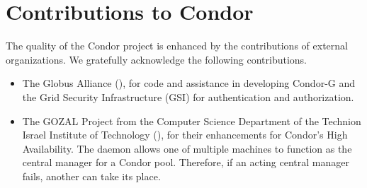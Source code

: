 \section{\label{sec:contributions}Contributions to Condor}

The quality of the Condor project is enhanced by the contributions
of external organizations.
We gratefully acknowledge the following contributions. 

\begin{itemize}
\item{The Globus Alliance} (), 
for code and assistance in developing Condor-G
and the Grid Security Infrastructure (GSI)
for authentication and authorization. 
\item{The GOZAL Project}
from the Computer Science Department
of the Technion Israel Institute of Technology
(),
for their enhancements for Condor's High Availability.
The  daemon allows one of multiple machines to function
as the central manager for a Condor pool.
Therefore, if an acting central manager fails,
another can take its place.
\end{itemize}
